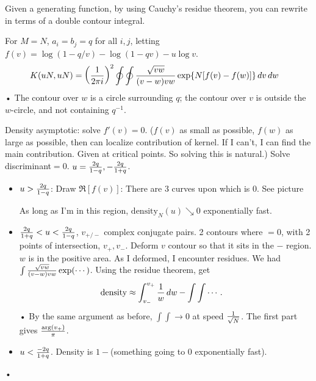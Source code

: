 Given a generating function, by using Cauchy's residue theorem, you can rewrite in terms of a double contour integral.
\begin{exr}
For $M=N$, $a_i=b_j=q$ for all $i,j$, letting $f(v) = \log(1-q/v) - \log(1-qv) - u\log v$.
\begin{align*}
K(uN,uN) &= \left( {\frac{1}{2\pi i}} \right)^2\oint\oint \frac{\sqrt{vw}}{(v-w)vw}
\exp\{N[f(v)-f(w)]\}\,dv\,dw
\end{align*}•
The contour over $w$ is a circle surrounding $q$; the contour over $v$ is outside the $w$-circle, and not containing $q^{-1}$.
\end{exr}
Density asymptotic: solve $f'(v)=0$. 
($f(v)$ as small as possible, $f(w)$ as large as possible, then can localize contribution of kernel. If I can't, I can find the main contribution. Given at critical points. So solving this is natural.)
Solve discriminant$=0$. $u=\frac{2q}{1-q}, -\frac{2q}{1+q}$.
\begin{itemize}
\item
$u>\frac{2q}{1-q}$:  Draw $\Re[f(v)]$: 
There are 3 curves upon which is 0. See picture

As long as I'm in this region, $\text{density}_N(u)\searrow 0$ exponentially fast.
\item
$\frac{2q}{1+q}<u<\frac{2q}{1-q}$, $v_{+/-}$ complex conjugate pairs.
2 contours where $=0$, with 2 points of intersection, $v_+,v_-$. %
Deform $v$ contour so that it sits in the $-$ region. $w$ is in the positive area. As I deformed, I encounter residues. We had $\int \frac{\sqrt{vw}}{(v-w)vw}\exp(\cdots)$. Using the residue theorem, get 
\begin{align*}
\text{density} &\approx \int_{v_-}^{v_+} \frac{1}{w} \,dw - \int \int \cdots.
\end{align*}•
By the same argument as before, $\int\int\to 0$ at speed $\frac{1}{\sqrt N}$. The first part gives $\frac{\arg(v_+)}{\pi}$.
\item
$u<\frac{-2q}{1+q}$. Density is $1-$(something going to 0 exponentially fast).
\end{itemize}•

